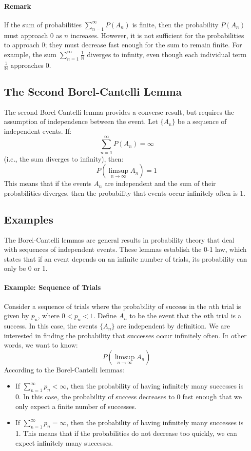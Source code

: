     \paragraph{Remark}
    If the sum of probabilities $\sum_{n=1}^{\infty} P(A_n)$ is finite, then the probability $P(A_n)$ must approach 0 as $n$ increases. However, it is not sufficient for the probabilities to approach 0; they must decrease fast enough for the sum to remain finite. For example, the sum $\sum_{n=1}^{\infty} \frac{1}{\mathbb{N}}$ diverges to infinity, even though each individual term $\frac{1}{\mathbb{N}}$ approaches 0.
    
    \subsection{The Second Borel-Cantelli Lemma}
    The second Borel-Cantelli lemma provides a converse result, but requires the assumption of independence between the event. \newline
    Let $\{A_n\}$ be a sequence of independent events. If:
    \[
    \sum_{n=1}^{\infty} P(A_n) = \infty
    \]
    (i.e., the sum diverges to infinity), then:
    \[
    P(\limsup_{n \to \infty} A_n) = 1
    \]
    This means that if the events $A_n$ are independent and the sum of their probabilities diverges, then the probability that events occur infinitely often is 1.
    
    \subsection{Examples}
    The Borel-Cantelli lemmas are general results in probability theory that deal with sequences of independent events. These lemmas establish the 0-1 law, which states that if an event depends on an infinite number of trials, its probability can only be 0 or 1.
    
    \paragraph{Example: Sequence of Trials}
    Consider a sequence of trials where the probability of success in the $n$th trial is given by $p_n$, where $0 < p_n < 1$. Define $A_n$ to be the event that the $n$th trial is a success. In this case, the events $\{A_n\}$ are independent by definition. \newline
    We are interested in finding the probability that successes occur infinitely often. In other words, we want to know:
    \[
    P\left( \limsup_{n \to \infty} A_n \right)
    \]
    According to the Borel-Cantelli lemmas:
    \begin{itemize}
        \item If $\sum_{n=1}^{\infty} p_n < \infty$, then the probability of having infinitely many successes is 0. In this case, the probability of success decreases to 0 fast enough that we only expect a finite number of successes.
        \item If $\sum_{n=1}^{\infty} p_n = \infty$, then the probability of having infinitely many successes is 1. This means that if the probabilities do not decrease too quickly, we can expect infinitely many successes.
    \end{itemize}
    
